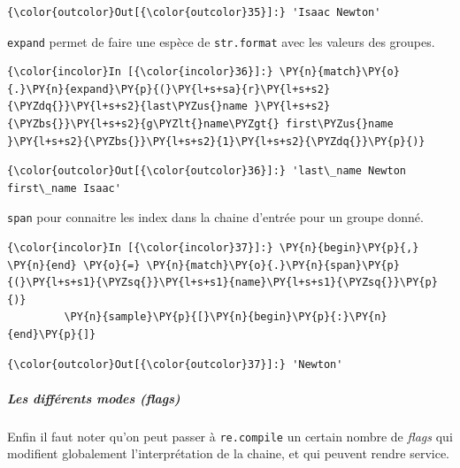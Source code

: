 \begin{Verbatim}[commandchars=\\\{\}]
{\color{outcolor}Out[{\color{outcolor}35}]:} 'Isaac Newton'
\end{Verbatim}
            
    \texttt{expand} permet de faire une espèce de \texttt{str.format} avec
les valeurs des groupes.

    \begin{Verbatim}[commandchars=\\\{\}]
{\color{incolor}In [{\color{incolor}36}]:} \PY{n}{match}\PY{o}{.}\PY{n}{expand}\PY{p}{(}\PY{l+s+sa}{r}\PY{l+s+s2}{\PYZdq{}}\PY{l+s+s2}{last\PYZus{}name }\PY{l+s+s2}{\PYZbs{}}\PY{l+s+s2}{g\PYZlt{}name\PYZgt{} first\PYZus{}name }\PY{l+s+s2}{\PYZbs{}}\PY{l+s+s2}{1}\PY{l+s+s2}{\PYZdq{}}\PY{p}{)}
\end{Verbatim}


\begin{Verbatim}[commandchars=\\\{\}]
{\color{outcolor}Out[{\color{outcolor}36}]:} 'last\_name Newton first\_name Isaac'
\end{Verbatim}
            
    \texttt{span} pour connaitre les index dans la chaine d'entrée pour un
groupe donné.

    \begin{Verbatim}[commandchars=\\\{\}]
{\color{incolor}In [{\color{incolor}37}]:} \PY{n}{begin}\PY{p}{,} \PY{n}{end} \PY{o}{=} \PY{n}{match}\PY{o}{.}\PY{n}{span}\PY{p}{(}\PY{l+s+s1}{\PYZsq{}}\PY{l+s+s1}{name}\PY{l+s+s1}{\PYZsq{}}\PY{p}{)}
         \PY{n}{sample}\PY{p}{[}\PY{n}{begin}\PY{p}{:}\PY{n}{end}\PY{p}{]}
\end{Verbatim}


\begin{Verbatim}[commandchars=\\\{\}]
{\color{outcolor}Out[{\color{outcolor}37}]:} 'Newton'
\end{Verbatim}
            
    \hypertarget{les-diffuxe9rents-modes-flags}{%
\subparagraph{\texorpdfstring{Les différents modes
(\emph{flags})}{Les différents modes (flags)}}\label{les-diffuxe9rents-modes-flags}}

    Enfin il faut noter qu'on peut passer à \texttt{re.compile} un certain
nombre de \emph{flags} qui modifient globalement l'interprétation de la
chaine, et qui peuvent rendre service.\\

